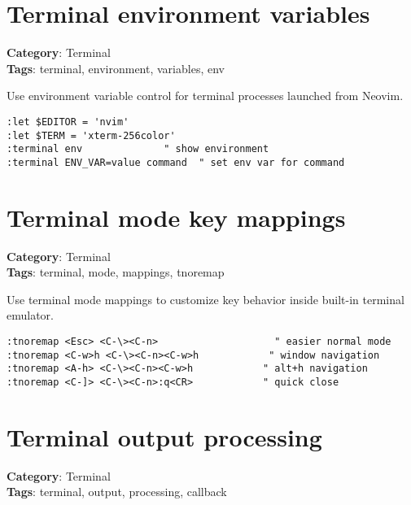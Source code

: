{{{{{{{{{{\section{Terminal environment variables}

\textbf{Category}: Terminal\\ \textbf{Tags}: terminal, environment, variables, env
\vspace{0.5cm}

Use environment variable control for terminal processes launched from Neovim.

\begin{Exa*}{}
\begin{Verbatim}[fontsize=\footnotesize, breaklines, breakanywhere]
:let $EDITOR = 'nvim'
:let $TERM = 'xterm-256color'
:terminal env              " show environment
:terminal ENV_VAR=value command  " set env var for command
\end{Verbatim}
\end{Exa*}

\section{Terminal mode key mappings}

\textbf{Category}: Terminal\\ \textbf{Tags}: terminal, mode, mappings, tnoremap
\vspace{0.5cm}

Use terminal mode mappings to customize key behavior inside built-in terminal emulator.

\begin{Exa*}{}
\begin{Verbatim}[fontsize=\footnotesize, breaklines, breakanywhere]
:tnoremap <Esc> <C-\><C-n>                    " easier normal mode
:tnoremap <C-w>h <C-\><C-n><C-w>h            " window navigation
:tnoremap <A-h> <C-\><C-n><C-w>h            " alt+h navigation
:tnoremap <C-]> <C-\><C-n>:q<CR>            " quick close
\end{Verbatim}
\end{Exa*}

\section{Terminal output processing}

\textbf{Category}: Terminal\\ \textbf{Tags}: terminal, output, processing, callback
\vspace{0.5cm}

}}}}}}}}}}
